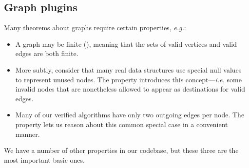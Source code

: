 \vspace{-0.75ex}
\subsection{Graph plugins}
\vspace{-0.75ex}
\label{subsec:graphplugins}
Many theorems about graphs require certain properties, \emph{e.g.}:
\begin{itemize}
\vspace{-1ex}
\item A graph may be finite (), meaning that the sets of valid vertices and valid edges are both finite.
\vspace{-1ex}
\item More subtly, consider that many real data structures use special null values to represent unused nodes.  The  property introduces this concept---\emph{i.e.} some invalid nodes that are nonetheless allowed to appear as destinations for valid edges.
\vspace{-1ex}
\item Many of our verified algorithms have only two outgoing edges per node.  The  property lets us reason about this common special case in a convenient manner.
\vspace{-1ex}
\end{itemize}
We have a number of other properties in our codebase, but these three are the most important basic ones.

